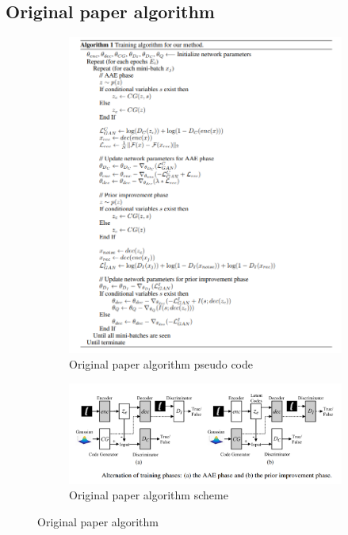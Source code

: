 \documentclass{article}
\begin{document}
    \subsection{Original paper algorithm}
    \begin{center}
        \begin{figure}[H]{\textwidth}
            \begin{subfigure}{0.5\textwidth}
                \centering
                \includegraphics[width=0.75\linewidth]{figures/original-code.png}
                \caption{Original paper algorithm pseudo code}
            \end{subfigure}
            \begin{subfigure}{0.5\textwidth}
                \centering
                \includegraphics[width=0.75\linewidth]{figures/original.png}
                \caption{Original paper algorithm scheme}
            \end{subfigure}%
            \caption{Original paper algorithm}
        \end{figure}
    \end{center}
\end{document}
